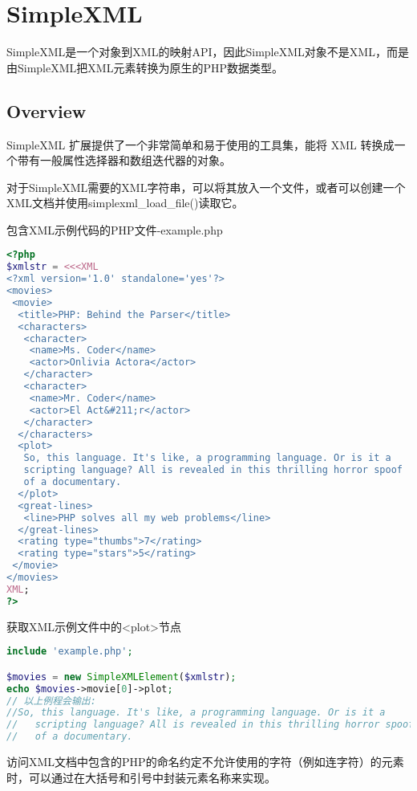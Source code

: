 \chapter{SimpleXML}

SimpleXML是一个对象到XML的映射API，因此SimpleXML对象不是XML，而是由SimpleXML把XML元素转换为原生的PHP数据类型。


\section{Overview}


SimpleXML 扩展提供了一个非常简单和易于使用的工具集，能将 XML 转换成一个带有一般属性选择器和数组迭代器的对象。


对于SimpleXML需要的XML字符串，可以将其放入一个文件，或者可以创建一个XML文档并使用simplexml\_load\_file()读取它。

\begin{example}
包含XML示例代码的PHP文件-example.php
\begin{lstlisting}[language=PHP]
<?php
$xmlstr = <<<XML
<?xml version='1.0' standalone='yes'?>
<movies>
 <movie>
  <title>PHP: Behind the Parser</title>
  <characters>
   <character>
    <name>Ms. Coder</name>
    <actor>Onlivia Actora</actor>
   </character>
   <character>
    <name>Mr. Coder</name>
    <actor>El Act&#211;r</actor>
   </character>
  </characters>
  <plot>
   So, this language. It's like, a programming language. Or is it a
   scripting language? All is revealed in this thrilling horror spoof
   of a documentary.
  </plot>
  <great-lines>
   <line>PHP solves all my web problems</line>
  </great-lines>
  <rating type="thumbs">7</rating>
  <rating type="stars">5</rating>
 </movie>
</movies>
XML;
?>
\end{lstlisting}
\end{example}

\begin{example}
获取XML示例文件中的<plot>节点
\begin{lstlisting}[language=PHP]
include 'example.php';

$movies = new SimpleXMLElement($xmlstr);
echo $movies->movie[0]->plot;
// 以上例程会输出:
//So, this language. It's like, a programming language. Or is it a
//   scripting language? All is revealed in this thrilling horror spoof
//   of a documentary.
\end{lstlisting}
\end{example}

访问XML文档中包含的PHP的命名约定不允许使用的字符（例如连字符）的元素时，可以通过在大括号和引号中封装元素名称来实现。



